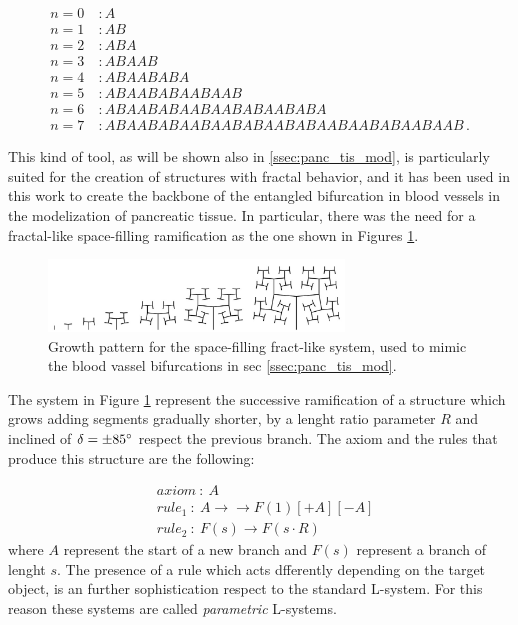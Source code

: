     \begin{align}
        n = 0 &\ : A \nonumber \\
        n = 1 &\ : AB \nonumber \\
        n = 2 &\ : ABA \nonumber \\
        n = 3 &\ : ABAAB \nonumber \\
        n = 4 &\ : ABAABABA \nonumber \\
        n = 5 &\ : ABAABABAABAAB \nonumber \\
        n = 6 &\ : ABAABABAABAABABAABABA \nonumber \\
        n = 7 &\ : ABAABABAABAABABAABABAABAABABAABAAB\,. \nonumber
    \end{align}

    This kind of tool, as will be shown also in \ref{ssec:panc_tis_mod}, is particularly suited for the creation of structures with fractal behavior, and it has been used in this work to create the backbone of the entangled bifurcation in blood vessels in the modelization of pancreatic tissue. In particular, there was the need for a fractal-like space-filling ramification as the one shown in Figures \ref{fig:bf_ls}.

    \begin{figure}
        \centering
        \includegraphics[width = 0.7\textwidth]{images/bf_ls}
        \caption{Growth pattern for the space-filling fract-like system, used to mimic the blood vassel bifurcations in sec \ref{ssec:panc_tis_mod}.}
        \label{fig:bf_ls}
    \end{figure}

    The system in Figure \ref{fig:bf_ls} represent the successive ramification of a structure which grows adding segments gradually shorter, by a lenght ratio parameter $R$ and inclined of $\delta = \pm 85 \degree$ respect the previous branch. The axiom and the rules that produce this structure are the following:

    \begin{align}
        & axiom\ :\ A \label{eq:bif_rules} \\
        & rule_1\ :\ A \rightarrow → F(1)[+A][-A] \nonumber \\
        & rule_2\ :\ F(s) \rightarrow F(s\cdot R) \nonumber
    \end{align}
    where $A$ represent the start of a new branch  and $F(s)$ represent a branch of lenght $s$. The presence of a rule which acts dfferently depending on the target object, is an further sophistication respect to the standard L-system. For this reason these systems are called \textit{parametric} L-systems.

